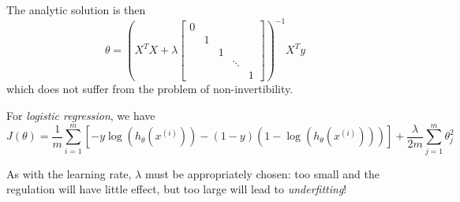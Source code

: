 \documentclass[a4paper,12pt]{article}
\theoremstyle{definition}
\begin{document}
The analytic solution is then
\[
\theta = \left( X^T X + \lambda 
\begin{bmatrix}
0 &  &  &  & \\ 
 & 1 &  &  & \\ 
 &  & 1 &  & \\ 
 &  &  & \ddots & \\ 
 &  &  &  & 1
\end{bmatrix}
\right)^{-1} X^T y
\]
which does not suffer from the problem of non-invertibility.

For \emph{logistic regression}, we have
\[
J(\theta) = \frac{1}{m} \sum_{i=1}^{m} \left[ - y \log(h_{\theta}(x^{(i)})) - (1 - y)(1 - \log(h_{\theta}(x^{(i)}))) \right] + \frac{\lambda}{2m} \sum_{j=1}^{m} \theta_j^2
\]

As with the learning rate, $\lambda$ must be appropriately chosen: too small and the regulation will have little effect, but too large will lead to \emph{underfitting}!
\end{document}

